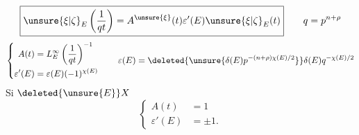 \[
\boxed{\unsure{\xi|\zeta}_E\left(\frac1{qt}\right)=A^{\unsure{\xi}}(t)\varepsilon'(E)\unsure{\xi|\zeta}_E(t)}
\qquad q=p^{n+\rho}
\]
\[
\left\{\begin{aligned}
A(t)&=L_E^\infty\left(\frac1{qt}\right)^{-1}\\
\varepsilon'(E)&=\varepsilon(E)(-1)^{\chi(E)}
\end{aligned}\right.
\qquad \varepsilon(E)=\deleted{\unsure{\delta(E)p^{-(n+\rho)\chi(E)/2}}}\delta(E)q^{-\chi(E)/2}
\]
Si $\deleted{\unsure{E}}X$ 
\[
\left\{\begin{aligned}A(t)&=1\\\varepsilon'(E)&=\pm1.\end{aligned}\right.
\]
